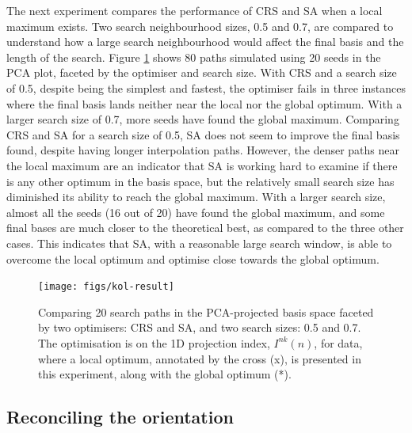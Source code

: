 The next experiment compares the performance of CRS and SA when a local maximum exists. Two search neighbourhood sizes, 0.5 and 0.7, are compared to understand how a large search neighbourhood would affect the final basis and the length of the search. Figure \ref{fig:kol-result} shows 80 paths simulated using 20 seeds in the PCA plot, faceted by the optimiser and search size. With CRS and a search size of 0.5, despite being the simplest and fastest, the optimiser fails in three instances where the final basis lands neither near the local nor the global optimum. With a larger search size of 0.7, more seeds have found the global maximum. Comparing CRS and SA for a search size of 0.5, SA does not seem to improve the final basis found, despite having longer interpolation paths. However, the denser paths near the local maximum are an indicator that SA is working hard to examine if there is any other optimum in the basis space, but the relatively small search size has diminished its ability to reach the global maximum. With a larger search size, almost all the seeds (16 out of 20) have found the global maximum, and some final bases are much closer to the theoretical best, as compared to the three other cases. This indicates that SA, with a reasonable large search window, is able to overcome the local optimum and optimise close towards the global optimum.

\begin{figure}

{\centering \texttt{[image: figs/kol-result]} 

}

\caption{Comparing 20 search paths in the PCA-projected basis space faceted by two optimisers: CRS and SA, and two search sizes: 0.5 and 0.7. The optimisation is on the 1D projection index, $I^{nk}(n)$, for  data, where a local optimum, annotated by the cross (x), is presented in this experiment, along with the global optimum (*).}\label{fig:kol-result}
\end{figure}

\hypertarget{reconciling-the-orientation}{%
\subsection{Reconciling the orientation}\label{reconciling-the-orientation}}


